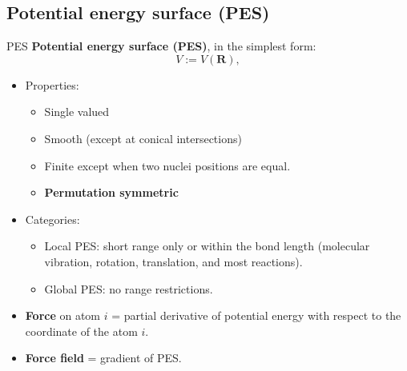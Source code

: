 \documentclass{beamer}
\newcommand\Fontvi{\fontsize{8}{7.2}\selectfont} %
\begin{document}
\subsection{Potential energy surface (PES)}
\begin{frame}{PES}
    \Fontvi
    \textbf{Potential energy surface (PES)}, in the simplest form:
    \begin{equation}
        V := V(\mathbf{R}),
    \end{equation}
    \begin{itemize}
        \item Properties:
        \begin{itemize}
            \Fontvi
            \item Single valued
            \item Smooth (except at conical intersections)
            \item Finite except when two nuclei positions are equal.
            \item \textbf{Permutation symmetric}
        \end{itemize}
        \item Categories:
        \begin{itemize}
            \Fontvi
            \item Local PES: short range only or within the bond length (molecular vibration, rotation, translation, and most reactions).
            \item Global PES: no range restrictions.
        \end{itemize}
        \item \textbf{Force} on atom $i$ = partial derivative of potential energy with respect to the coordinate of the atom $i$.
        \item \textbf{Force field} = gradient of PES.
    \end{itemize}
    
\end{frame}
\end{document}
